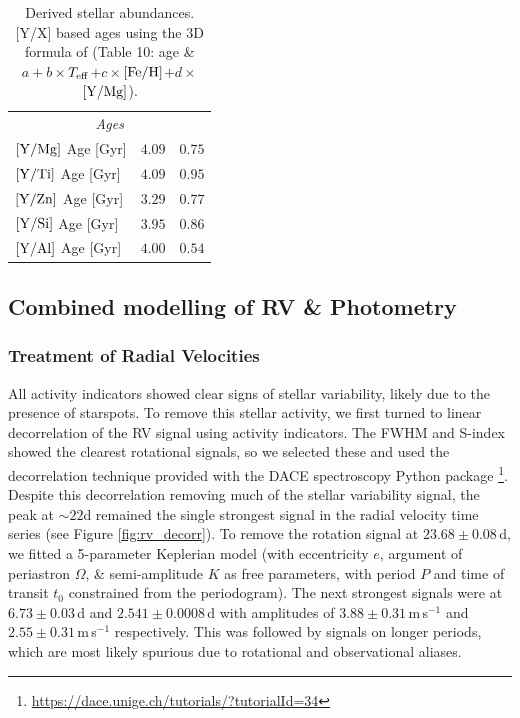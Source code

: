 \documentclass[fleqn,usenatbib]{mnras}
\newcommand{\ms}{m\,s$^{-1}$}
\newcommand{\teff}{$T_{\rm eff}$}
\newcommand{\feh}{\mbox{$\rm [Fe/H]$}}
\newcommand{\ymg}{\mbox{$\rm [Y/Mg]$}}
\begin{document}
\begin{table}
\begin{tabular}{lcc}
        \hline
        \multicolumn{3}{c}{\it Ages}\\
        $[\rm{Y}/\rm{Mg}]$ Age [Gyr]  & $ 4.09 $ & $ 0.75 $ \\
        $[\rm{Y}/\rm{Ti}]$ Age [Gyr]  & $ 4.09 $ & $ 0.95 $ \\
        $[\rm{Y}/\rm{Zn}]$ Age [Gyr]  & $ 3.29 $ & $ 0.77 $ \\
        $[\rm{Y}/\rm{Si}]$ Age [Gyr]  & $ 3.95 $ & $ 0.86 $ \\
        $[\rm{Y}/\rm{Al}]$ Age [Gyr]  & $ 4.00 $ & $ 0.54 $ \\
        \hline
        \hline
    \end{tabular}
    \caption{Derived stellar abundances. [Y/X] based ages using the 3D formula of \citet{Delgado-19} (Table 10: age \&  $a + b \times$\teff{}$+ c \times$\feh{}$ + d \times$\ymg{}).}
    \label{tab:abunds}
\end{table}


\subsection{Combined modelling of RV \& Photometry}

\subsubsection{Treatment of Radial Velocities}\label{sect:rvs}
All activity indicators showed clear signs of stellar variability, likely due to the presence of starspots.
To remove this stellar activity, we first turned to linear decorrelation of the RV signal using activity indicators.
The FWHM and S-index showed the clearest rotational signals, so we selected these and used the decorrelation technique provided with the DACE spectroscopy Python package \citep{2015ASPC..495....7B}\footnote{\url{https://dace.unige.ch/tutorials/?tutorialId=34}}.
Despite this decorrelation removing much of the stellar variability signal, the peak at $\sim22$d remained the single strongest signal in the radial velocity time series (see Figure \ref{fig:rv_decorr}).
To remove the rotation signal at $23.68\pm0.08$\,d, we fitted a 5-parameter Keplerian model (with eccentricity $e$, argument of periastron $\Omega$, \& semi-amplitude $K$ as free parameters, with period $P$ and time of transit $t_0$ constrained from the periodogram).
The next strongest signals were at $6.73\pm0.03$\,d and $2.541\pm0.0008$\,d with amplitudes of $3.88\pm0.31$\,\ms{} and $2.55\pm0.31$\,\ms{} respectively. This was followed by signals on longer periods, which are most likely spurious due to rotational and observational aliases.
\end{document}
